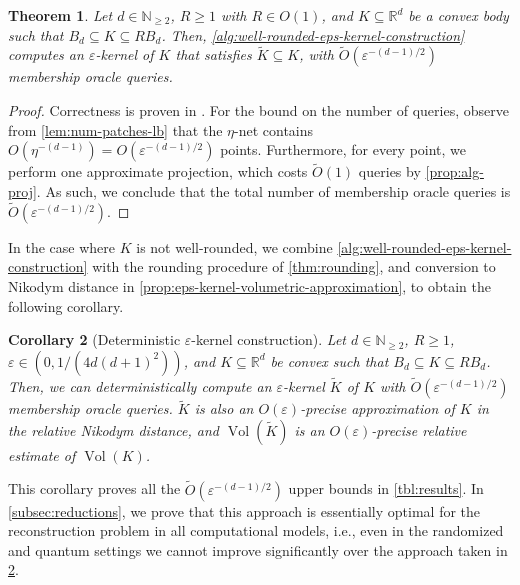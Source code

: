 \documentclass[11pt]{article}
\newtheorem{theorem}{Theorem}[section]
\newtheorem{corollary}[theorem]{Corollary}
\newcommand{\N}{\ensuremath{\mathbb{N}}}
\newcommand{\R}{\ensuremath{\mathbb{R}}}
\DeclareMathOperator{\Vol}{Vol}
\begin{document}
    \begin{theorem}
        \label{thm:well-rounded-eps-kernel-construction}
        Let $d \in \N_{\geq 2}$, $R \geq 1$ with $R \in O(1)$, and $K \subseteq \R^d$ be a convex body such that $B_d \subseteq K \subseteq RB_d$. Then, \cref{alg:well-rounded-eps-kernel-construction} computes an $\varepsilon$-kernel of $K$ that satisfies $\widetilde{K} \subseteq K$, with $\widetilde{O}(\varepsilon^{-(d-1)/2})$ membership oracle queries.
    \end{theorem}

    \begin{proof}
        Correctness is proven in \cite[Theorem~1]{yu2008practical}. For the bound on the number of queries, observe from \cref{lem:num-patches-lb} that the $\eta$-net contains $O(\eta^{-(d-1)}) = O(\varepsilon^{-(d-1)/2})$ points. Furthermore, for every point, we perform one approximate projection, which costs $\widetilde{O}(1)$ queries by \cref{prop:alg-proj}. As such, we conclude that the total number of membership oracle queries is $\widetilde{O}(\varepsilon^{-(d-1)/2})$.
    \end{proof}

    In the case where $K$ is not well-rounded, we combine \cref{alg:well-rounded-eps-kernel-construction} with the rounding procedure of \cref{thm:rounding}, and conversion to Nikodym distance in \cref{prop:eps-kernel-volumetric-approximation}, to obtain the following corollary.

    \begin{corollary}[Deterministic $\varepsilon$-kernel construction]
        \label{thm:eps-kernel-construction}
        Let $d \in \N_{\geq 2}$, $R \geq 1$, $\varepsilon \in (0,1/(4d(d+1)^2))$, and $K \subseteq \R^d$ be convex such that $B_d \subseteq K \subseteq RB_d$. Then, we can deterministically compute an $\varepsilon$-kernel $\widetilde{K}$ of $K$ with $\widetilde{O}(\varepsilon^{-(d-1)/2})$ membership oracle queries. $\widetilde{K}$ is also an $O(\varepsilon)$-precise approximation of $K$ in the relative Nikodym distance, and $\Vol(\widetilde{K})$ is an $O(\varepsilon)$-precise relative estimate of $\Vol(K)$.
    \end{corollary}

    This corollary proves all the $\widetilde{O}(\varepsilon^{-(d-1)/2})$ upper bounds in \cref{tbl:results}. In \cref{subsec:reductions}, we prove that this approach is essentially optimal for the reconstruction problem in all computational models, i.e., even in the randomized and quantum settings we cannot improve significantly over the approach taken in \cref{thm:eps-kernel-construction}.
\end{document}
